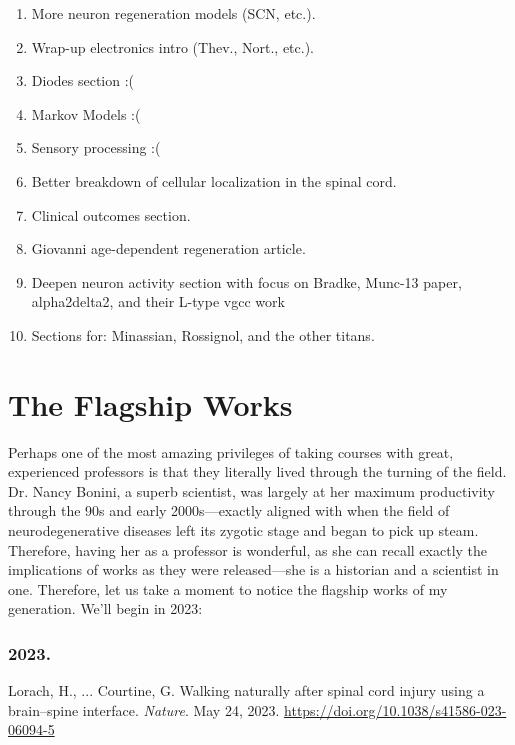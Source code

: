 \footnotesize
\begin{enumerate}
    \item More neuron regeneration models (SCN, etc.).
    \item Wrap-up electronics intro (Thev., Nort., etc.). 
    \item Diodes section :(
    \item Markov Models :(
    \item Sensory processing :(
    \item Better breakdown of cellular localization in the spinal cord. 
    \item Clinical outcomes section. 
    \item Giovanni age-dependent regeneration article.
    \item Deepen neuron activity section with focus on Bradke, Munc-13 paper, alpha2delta2, and their L-type vgcc work
    \item Sections for: Minassian, Rossignol, and the other titans. 
    
\end{enumerate}

\normalsize

\vfill\pagebreak

\section{The Flagship Works}

Perhaps one of the most amazing privileges of taking courses with great, experienced professors is that they literally lived through the turning of the field. Dr. Nancy Bonini, a superb scientist, was largely at her maximum productivity through the 90s and early 2000s---exactly aligned with when the field of neurodegenerative diseases left its zygotic stage and began to pick up steam. Therefore, having her as a professor is wonderful, as she can recall exactly the implications of works as they were released---she is a historian and a scientist in one. Therefore, let us take a moment to notice the flagship works of my generation. We'll begin in 2023: 

\subsubsection{2023.}


Lorach, H., ... Courtine, G. Walking naturally after spinal cord injury using a brain–spine interface. \textit{Nature}. May 24, 2023. \url{https://doi.org/10.1038/s41586-023-06094-5}

